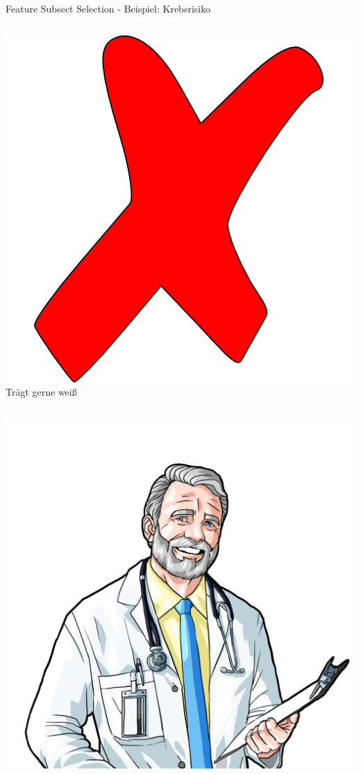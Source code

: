\documentclass[xcolor=dvipsnames]{beamer}
\begin{document}
\begin{frame}{Feature Subsect Selection - Beispiel: Krebsrisiko}
\begin{columns}
\begin{column}{0.3\textwidth}
                     \includegraphics[width=(\textwidth / 3)]{img/cross.png}
                     Trägt gerne weiß
            \end{column}
        \end{columns}
        \begin{columns}
            \begin{column}{\textwidth}
                \center
                \includegraphics[width=(\textwidth / 2)]{img/concerned_doctor.png}
            \end{column}
        \end{columns}
    \end{frame}
\end{document}
